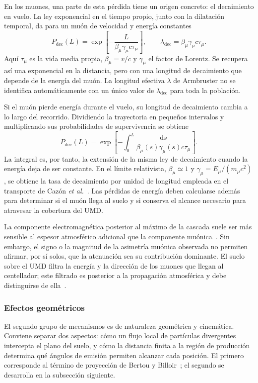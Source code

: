 En los muones, una parte de esta pérdida tiene un origen concreto: el decaimiento en vuelo. La ley exponencial en el tiempo propio, junto con la dilatación temporal, da para un muón de velocidad y energía constantes
\[
P_{\mathrm{dec}}(L)=\exp\!\left[-\frac{L}{\beta_\mu\gamma_\mu c\tau_\mu}\right],
\qquad
\lambda_{\mathrm{dec}}=\beta_\mu\gamma_\mu c\tau_\mu.
\]
Aquí $\tau_\mu$ es la vida media propia, $\beta_\mu=v/c$ y $\gamma_\mu$ el factor de Lorentz. Se recupera así una exponencial en la distancia, pero con una longitud de decaimiento que depende de la energía del muón. La longitud efectiva $\lambda$ de Armbruster no se identifica automáticamente con un único valor de $\lambda_{\mathrm{dec}}$ para toda la población.

Si el muón pierde energía durante el vuelo, su longitud de decaimiento cambia a lo largo del recorrido. Dividiendo la trayectoria en pequeños intervalos y multiplicando sus probabilidades de supervivencia se obtiene
\[
P_{\mathrm{dec}}(L)=
\exp\!\left[-\int_0^L
\frac{\mathrm ds}{\beta_\mu(s)\gamma_\mu(s)c\tau_\mu}\right].
\]
La integral es, por tanto, la extensión de la misma ley de decaimiento cuando la energía deja de ser constante. En el límite relativista, $\beta_\mu\simeq1$ y $\gamma_\mu=E_\mu/(m_\mu c^2)$, se obtiene la tasa de decaimiento por unidad de longitud empleada en el transporte de Cazón \textit{et al.}~\cite[Sec.~3.2]{Cazon2012}. Las pérdidas de energía deben calcularse además para determinar si el muón llega al suelo y si conserva el alcance necesario para atravesar la cobertura del UMD.

La componente electromagnética posterior al máximo de la cascada suele ser más sensible al espesor atmosférico adicional que la componente muónica~\cite{Pryke1998,BradfieldThesis}. Sin embargo, el signo o la magnitud de la asimetría muónica observada no permiten afirmar, por sí solos, que la atenuación sea su contribución dominante. El suelo sobre el UMD filtra la energía y la dirección de los muones que llegan al centellador; este filtrado es posterior a la propagación atmosférica y debe distinguirse de ella~\cite{UMD_Design2016}.

\subsubsection{Efectos geométricos}
\label{subsubsec:divergencia}

El segundo grupo de mecanismos es de naturaleza geométrica y cinemática. Conviene separar dos aspectos: cómo un flujo local de partículas divergentes intercepta el plano del suelo, y cómo la distancia finita a la región de producción determina qué ángulos de emisión permiten alcanzar cada posición. El primero corresponde al término de proyección de Bertou y Billoir~\cite{GAP2000_017}; el segundo se desarrolla en la subsección siguiente.

